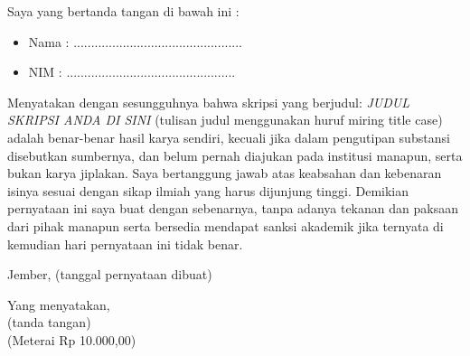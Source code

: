\documentclass[12pt, a4paper, onecolumn, oneside]{report}
\newcommand{\thetitle}{JUDUL SKRIPSI ANDA DI SINI} %
\newcommand{\thestudyprogram}{\textless\textless NAMA PROGRAM STUDI\textgreater\textgreater} %
\newcommand{\thefaculty}{\textless\textless NAMA FAKULTAS\textgreater\textgreater} %
\begin{document}


\vspace{0.5cm} %

\noindent Saya yang bertanda tangan di bawah ini :
\begin{itemize}
    \item[] Nama \quad\quad: ................................................
    \item[] NIM \quad\quad\quad: ................................................
\end{itemize}

\noindent Menyatakan dengan sesungguhnya bahwa skripsi yang berjudul: \textit{\thetitle} (tulisan judul menggunakan huruf miring title case)
adalah benar-benar hasil karya sendiri, kecuali jika dalam pengutipan substansi disebutkan sumbernya, dan belum pernah diajukan pada institusi manapun, serta bukan karya jiplakan.
Saya bertanggung jawab atas keabsahan dan kebenaran isinya sesuai dengan sikap ilmiah yang harus dijunjung tinggi.
Demikian pernyataan ini saya buat dengan sebenarnya, tanpa adanya tekanan dan paksaan dari pihak manapun serta bersedia mendapat sanksi akademik jika ternyata di kemudian hari pernyataan ini tidak benar.

\vspace{1.5cm} %

\raggedleft Jember, (tanggal pernyataan dibuat)

\raggedleft Yang menyatakan, \\
\vspace{1cm} %
\raggedleft (tanda tangan) \\
\raggedleft (Meterai Rp 10.000,00)
\end{document}
